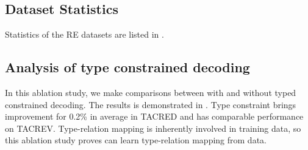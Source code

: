 \subsection{Dataset Statistics}

Statistics of the RE datasets are listed in .

\begin{table}[h]
    \centering
    \small
    \begin{threeparttable}
    \end{threeparttable}
\caption{Statistics of datasets}
    \label{tab:dataset-statistics}
\end{table}



\subsection{Analysis of type constrained decoding} \label{ssec:type_constrained_decoding}

In this ablation study, we make comparisons between \modelname with and without typed constrained decoding. The results is demonstrated in . Type constraint brings improvement for 0.2\% in average in TACRED and has comparable performance on TACREV. Type-relation mapping is inherently involved in training data, so this ablation study proves \modelname can learn type-relation mapping from data.

